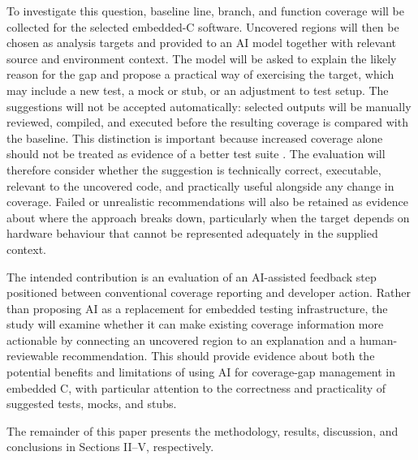 \documentclass[conference]{IEEEtran}
\begin{document}
To investigate this question, baseline line, branch, and function coverage will
be collected for the selected embedded-C software. Uncovered regions will
then be chosen as analysis targets and provided to an AI model together with
relevant source and environment context. The model will be asked to explain the
likely reason for the gap and propose a practical way of exercising the target,
which may include a new test, a mock or stub, or an adjustment to test setup.
The suggestions will not be accepted automatically: selected outputs will be
manually reviewed, compiled, and executed before the resulting coverage is
compared with the baseline. This distinction is important because increased
coverage alone should not be treated as evidence of a better test suite
\cite{inozemtseva2014}. The evaluation will therefore consider whether the
suggestion is technically correct, executable, relevant to the uncovered code,
and practically useful alongside any change in coverage. Failed or unrealistic
recommendations will also be retained as evidence about where the approach
breaks down, particularly when the target depends on hardware behaviour that
cannot be represented adequately in the supplied context.

The intended contribution is an evaluation of an AI-assisted feedback step
positioned between conventional coverage reporting and developer action. Rather
than proposing AI as a replacement for embedded testing infrastructure, the
study will examine whether it can make existing coverage information more
actionable by connecting an uncovered region to an explanation and a
human-reviewable recommendation. This should provide evidence about both the
potential benefits and limitations of using AI for coverage-gap management
in embedded C, with particular attention to the correctness and practicality
of suggested tests, mocks, and stubs.

The remainder of this paper presents the methodology, results, discussion, and conclusions in Sections II--V, respectively.



\end{document}
